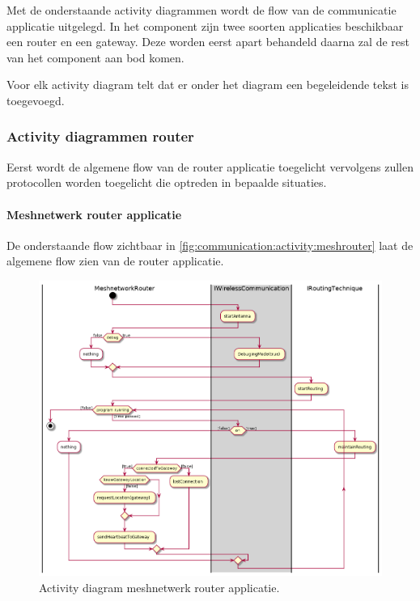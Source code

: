 \documentclass[a4paper, 11pt, oneside]{report}
\begin{document}
Met de onderstaande activity diagrammen wordt de flow van de communicatie applicatie uitgelegd. 
In het component zijn twee soorten applicaties beschikbaar een router en een gateway. 
Deze worden eerst apart behandeld daarna zal de rest van het component aan bod komen.

Voor elk activity diagram telt dat er onder het diagram een begeleidende tekst is toegevoegd.

\subsubsection{Activity diagrammen router}
\label{DetailedDesign:Communicatie:Activity:router}

Eerst wordt de algemene flow van de router applicatie toegelicht vervolgens zullen protocollen worden toegelicht die optreden in bepaalde situaties.

\paragraph{Meshnetwerk router applicatie}
\label{DetailedDesign:Communicatie:Activity:router:applicatie}
De onderstaande flow zichtbaar in \autoref{fig:communication:activity:meshrouter} laat de algemene flow zien van de router applicatie. 


\begin{figure}[H]
	\begin{center}\includegraphics[width=.83\linewidth]{UML/out/Communication/activity/MeshRouter/MeshRouter.png}\end{center}
	\caption{Activity diagram meshnetwerk router applicatie.}
	\label{fig:communication:activity:meshrouter}
\end{figure}
\end{document}
